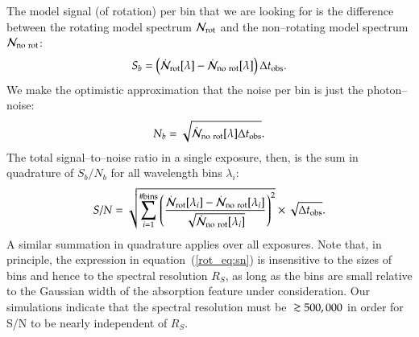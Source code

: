 The model signal (of rotation) per bin that we are looking for is the
difference between the rotating model spectrum $\mathcal{N}_{\rm rot}$
and the non--rotating model spectrum $\mathcal{N}_{\rm no~rot}$:
\begin{equation}
S_b = \left(\dot{\mathcal{N}}_{\rm rot}[\lambda] - \dot{\mathcal{N}}_{\rm no~rot}[\lambda]\right) \Delta t_{\rm obs}.
\label{rot_eq:signal}
\end{equation}
We make the optimistic approximation that the noise per bin is just
the photon--noise:
\begin{equation}
N_b = \sqrt{\dot{\mathcal{N}}_{\rm no~rot}[\lambda] \Delta t_{\rm obs}}.
\label{rot_eq:noise}
\end{equation}
The total signal--to--noise ratio in a single exposure, then, is the
sum in quadrature of $S_b/N_b$ for all wavelength bins $\lambda_i$:
\begin{equation}
S/N = \sqrt{\sum_{i = 1}^{\# \rm bins} \left( \frac{\dot{\mathcal{N}}_{\rm rot}[\lambda_i] - \dot{\mathcal{N}}_{\rm no~rot}[\lambda_i]}{\sqrt{\dot{\mathcal{N}}_{\rm no~rot}[\lambda_i]}} \right)^2 } \times \sqrt{\Delta t_{\rm obs}}.
\label{rot_eq:sn}
\end{equation}
A similar summation in quadrature applies over all exposures.  Note
that, in principle, the expression in equation~(\ref{rot_eq:sn}) is
insensitive to the sizes of bins and hence to the spectral resolution
$R_S$, as long as the bins are small relative to the Gaussian width of
the absorption feature under consideration.  Our simulations indicate
that the spectral resolution must be $\gsim 500,000$ in order for S/N
to be nearly independent of $R_S$.

